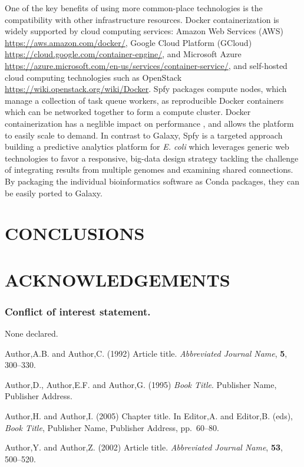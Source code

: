 \documentclass[a4,center,fleqn]{NAR}
\begin{document}
One of the key benefits of using more common-place technologies is the compatibility with other infrastructure resources.
Docker containerization is widely supported by cloud computing services: Amazon Web Services (AWS) \url{https://aws.amazon.com/docker/}, Google Cloud Platform (GCloud) \url{https://cloud.google.com/container-engine/}, and Microsoft Azure \url{https://azure.microsoft.com/en-us/services/container-service/}, and self-hosted cloud computing technologies such as OpenStack \url{https://wiki.openstack.org/wiki/Docker}.
Spfy packages compute nodes, which manage a collection of task queue workers, as reproducible Docker containers which can be networked together to form a compute cluster.
Docker containerization has a neglible impact on performance \cite{di2015impact}, and allows the platform to easily scale to demand.
In contrast to Galaxy, Spfy is a targeted approach building a predictive analytics platform for \textit{E. coli} which leverages generic web technologies to favor a responsive, big-data design strategy tackling the challenge \cite{fricke2014bacterial} of integrating results from multiple genomes and examining shared connections.
By packaging the individual bioinformatics software as Conda packages, they can be easily ported to Galaxy.

\section{CONCLUSIONS}

\section{ACKNOWLEDGEMENTS}


\subsubsection{Conflict of interest statement.} None declared.
\newpage


\begin{thebibliography}{4}

Author,A.B. and Author,C. (1992)
Article title.
\textit{Abbreviated Journal Name}, \textbf{5}, 300--330.

Author,D., Author,E.F. and Author,G. (1995)
\textit{Book Title}.
Publisher Name, Publisher Address.

Author,H. and Author,I. (2005)
Chapter title.
In
Editor,A. and Editor,B. (eds),
\textit{Book Title},
Publisher Name, Publisher Address,
pp.\ 60--80.

Author,Y. and Author,Z. (2002)
Article title.
\textit{Abbreviated Journal Name}, \textbf{53}, 500--520.

\end{thebibliography}
\end{document}
